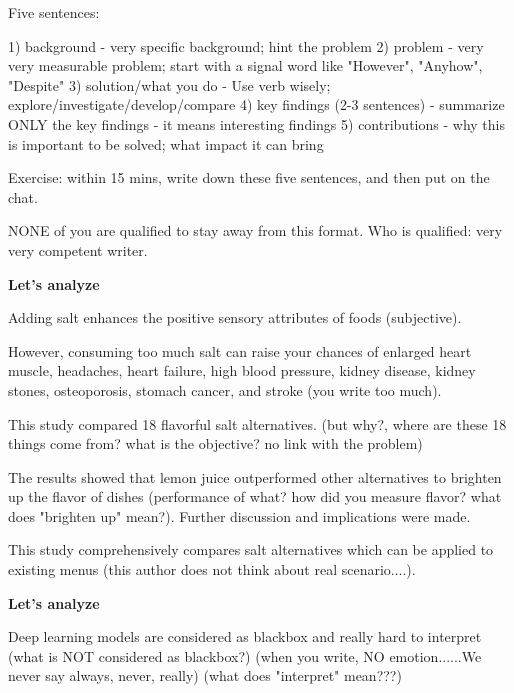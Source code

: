
\setlength{\parindent}{0pt}
\setlength{\parskip}{1em}
\setlength{\baselineskip}{1.5em}

\begin{center}
  \fontsize{14}{17}
\end{center}
\vspace{2em}

Five sentences:

1)  background
    - very specific background; hint the problem
2)  problem
    - very very measurable problem; start with a signal word like "However", "Anyhow", "Despite"
3)  solution/what you do
    - Use verb wisely; explore/investigate/develop/compare
4)  key findings (2-3 sentences)
    - summarize ONLY the key findings - it means interesting findings
5)  contributions
    - why this is important to be solved; what impact it can bring
    
Exercise: within 15 mins, write down these five sentences, and then put on the chat.    
    
NONE of you are qualified to stay away from this format.
Who is qualified:  very very competent writer.


\textbf{Let's analyze}

Adding salt enhances the positive sensory attributes of foods (subjective). 

However, consuming too much salt can raise your chances of enlarged heart muscle, headaches, heart failure, high blood pressure, kidney disease, kidney stones, osteoporosis, stomach cancer, and stroke (you write too much). 

This study compared 18 flavorful salt alternatives.  (but why?, where are these 18 things come from? what is the objective? no link with the problem) 

The results showed that lemon juice outperformed other alternatives to brighten up the flavor of dishes (performance of what? how did you measure flavor? what does "brighten up" mean?). Further discussion and implications were made. 

This study comprehensively compares salt alternatives which can be applied to existing menus (this author does not think about real scenario....).

\textbf{Let's analyze}

Deep learning models are considered as blackbox and really hard to interpret (what is NOT considered as blackbox?) (when you write, NO emotion......We never say always, never, really)  (what does "interpret" mean???)

